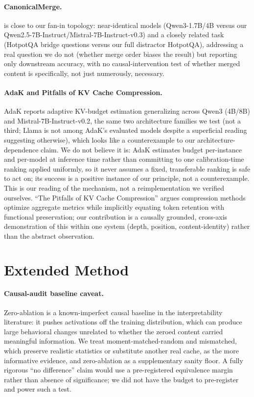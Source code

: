 \documentclass[11pt]{article}
\begin{document}
\paragraph{CanonicalMerge.} \citep{canonicalmerge2026} is close to our
fan-in topology: near-identical models (Qwen3-1.7B/4B versus our
Qwen2.5-7B-Instruct/Mistral-7B-Instruct-v0.3) and a closely related task
(HotpotQA bridge questions versus our full distractor HotpotQA),
addressing a real question we do not (whether merge order biases the
result) but reporting only downstream accuracy, with no
causal-intervention test of whether merged content is specifically, not
just numerously, necessary.

\paragraph{AdaK and Pitfalls of KV Cache Compression.} AdaK
\citep{adak2026} reports adaptive KV-budget estimation generalizing
across Qwen3 (4B/8B) and Mistral-7B-Instruct-v0.2, the same two
architecture families we test (not a third; Llama is not among AdaK's
evaluated models despite a superficial reading suggesting otherwise),
which looks like a counterexample to our architecture-dependence claim.
We do not believe it is: AdaK estimates budget per-instance and
per-model at inference time rather than committing to one
calibration-time ranking applied uniformly, so it never assumes a
fixed, transferable ranking is safe to act on; its success is a
positive instance of our principle, not a counterexample. This is our
reading of the mechanism, not a reimplementation we verified ourselves.
``The Pitfalls of KV Cache Compression'' \citep{pitfallskv2026} argues
compression methods optimize aggregate metrics while implicitly
equating token retention with functional preservation; our contribution
is a causally grounded, cross-axis demonstration of this within one
system (depth, position, content-identity) rather than the abstract
observation.

\section{Extended Method}
\label{app:method-ext}

\paragraph{Causal-audit baseline caveat.} Zero-ablation is a
known-imperfect causal baseline in the interpretability literature: it
pushes activations off the training distribution, which can produce
large behavioral changes unrelated to whether the zeroed content
carried meaningful information. We treat moment-matched-random and
mismatched, which preserve realistic statistics or substitute another
real cache, as the more informative evidence, and zero-ablation as a
supplementary sanity floor. A fully rigorous ``no difference'' claim
would use a pre-registered equivalence margin rather than absence of
significance; we did not have the budget to pre-register and power such
a test.
\end{document}
